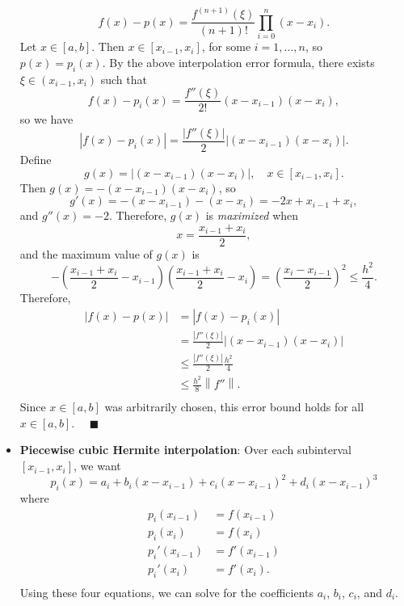 \documentclass{report}
\begin{document}
\begin{itemize}
            $$f(x) - p(x) = \frac{f^{(n+1)}(\xi)}{(n+1)!} \prod_{i=0}^n (x-x_i).$$
            Let $x \in [a,b]$. Then $x \in [x_{i-1},x_i]$, for some $i=1,\ldots,n$, so $p(x) = p_i(x)$.
            \bigbreak \noindent 
            By the above interpolation error formula, there exists $\xi \in (x_{i-1},x_i)$ such that
            $$f(x) - p_i(x) = \frac{f''(\xi)}{2!} (x-x_{i-1})(x-x_i),$$
            so we have
            $$\left|f(x) - p_i(x)\right| = \frac{\left|f''(\xi)\right|}{2} \left|(x-x_{i-1})(x-x_i)\right|.$$
            \bigbreak \noindent 
            Define 
            $$g(x) = \left|(x-x_{i-1})(x-x_i)\right|, \quad x \in [x_{i-1},x_i].$$
            Then $g(x) = -(x-x_{i-1})(x-x_i)$, so 
            $$g'(x) = -(x-x_{i-1}) - (x-x_i) = -2x + x_{i-1} + x_i,$$ 
            and $g''(x) = -2$. Therefore, $g(x)$ is \textit{maximized} when 
            $$x = \frac{x_{i-1}+x_i}{2},$$
            and the maximum value of $g(x)$ is 
            $$-\left(\frac{x_{i-1}+x_i}{2}-x_{i-1}\right)\left(\frac{x_{i-1}+x_i}{2} -x_i\right) = \left(\frac{x_{i}-x_{i-1}}{2}\right)^2 \leq \frac{h^2}{4}.$$
            Therefore,
            $$
            \begin{align}
                \left|f(x) - p(x)\right| 
&= \left|f(x) - p_i(x)\right| \\
&= \frac{\left|f''(\xi)\right|}{2} \left|(x-x_{i-1})(x-x_i)\right|\\
&\leq \frac{\left|f''(\xi)\right|}{2} \frac{h^2}{4}\\
&\leq \frac{h^2}{8} \left\|f''\right\|. \\
            \end{align}
            $$
            Since $x \in [a,b]$ was arbitrarily chosen, this error bound holds for all $x \in [a,b]$. $\quad \blacksquare$
        \item \textbf{Piecewise cubic Hermite interpolation}:
            Over each subinterval $[x_{i-1}, x_{i}]$, we want
            $$p_i(x) = a_i + b_i(x-x_{i-1}) + c_i(x-x_{i-1})^2 + d_i(x-x_{i-1})^3$$
            where
            $$
            \begin{align}
                p_i(x_{i-1}) &= f(x_{i-1}) \\
                p_i(x_{i}) &= f(x_{i}) \\
                p_i'(x_{i-1}) &= f'(x_{i-1}) \\
                p_i'(x_{i}) &= f'(x_{i}). \\
            \end{align}
            $$
            Using these four equations, we can solve for the coefficients $a_i$, $b_i$, $c_i$, and $d_i$.

\end{itemize}
\end{document}
